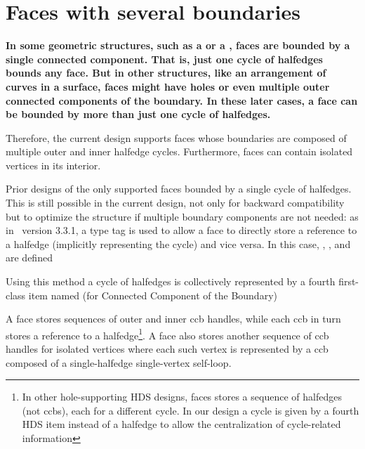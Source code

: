
\section{Faces with several boundaries}

{\bf\ttfamily
In some geometric structures, such as a  or a ,
faces are bounded by a single connected component. That is, just one cycle of halfedges bounds
any face. But in other structures, like an arrangement of curves in a surface, faces
might have holes or even multiple outer connected components of the boundary. 
In these later cases, a face can be bounded by more than just one cycle of halfedges. 

Therefore, the current  design supports faces
whose boundaries are composed of multiple outer and inner halfedge cycles. Furthermore, faces can contain isolated vertices in its interior.




Prior designs of the  only supported faces bounded by
a single cycle of halfedges.
This is still possible in the current design, not only for backward compatibility 
but to optimize the structure if multiple boundary components are not needed:
as in \cgal\ version 3.3.1, a type tag is used to allow a face to directly store 
a reference to a halfedge (implicitly representing the cycle) and vice versa. In this case, , ,  
and  are defined


Using this method a cycle of halfedges is collectively represented 
by a fourth first-class  item named  (for Connected Component of the Boundary) 

A face stores sequences of outer and inner ccb handles, while each ccb in turn stores
a reference to a halfedge\footnote{In other hole-supporting HDS designs, faces stores a sequence of halfedges (not ccbs), each for a different cycle. In our design a cycle is given by a fourth HDS item instead of a halfedge to allow the centralization of cycle-related information}. 
A face also stores another sequence of ccb handles for isolated vertices where each such vertex is represented by a ccb composed of a single-halfedge single-vertex self-loop.

}
